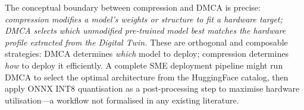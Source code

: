 The conceptual boundary between compression and DMCA is precise:
\emph{compression modifies a model's weights or structure to fit
a hardware target; DMCA selects which unmodified pre-trained model
best matches the hardware profile extracted from the Digital Twin.}
These are orthogonal and composable strategies: DMCA determines
\emph{which} model to deploy; compression determines \emph{how}
to deploy it efficiently.
A complete SME deployment pipeline might run DMCA to select
the optimal architecture from the HuggingFace catalog, then
apply ONNX INT8 quantisation as a post-processing step to
maximise hardware utilisation—a workflow not formalised in any
existing literature.

\begin{table}[t]
\caption{Model compression approaches vs.\ DMCA's selection
  approach. The two paradigms are orthogonal: compression
  operates on a fixed model; DMCA selects among models.
  ``Modifies weights'' = the technique changes model
  parameters or architecture.}
\label{tab:compression}
\centering\small
\renewcommand{\arraystretch}{1.15}
\end{table}

